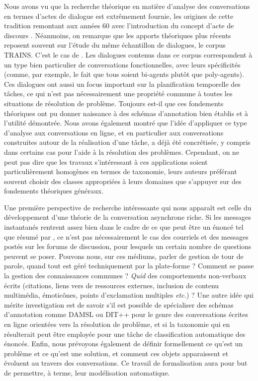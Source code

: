 \documentclass[10pt,a4paper,twoside]{article}
\begin{document}
Nous avons vu que la recherche théorique en matière d'analyse des conversations en termes d'actes de dialogue est extrêmement fournie, les origines de cette tradition remontant aux années 60 avec l'introduction du concept d'acte de discours \cite{austin1975how, searle1969speech}. Néanmoins, on remarque que les apports théoriques plus récents reposent souvent sur l'étude du même échantillon de dialogues, le corpus TRAINS. C'est le cas de \citet{traum1992conversation, poesio1998towards, core1997coding, bunt2009dit++}. Les dialogues contenus dans ce corpus correspondent à un type bien particulier de conversations fonctionnelles, avec leurs spécificités (comme, par exemple, le fait que tous soient bi-agents plutôt que poly-agents). Ces dialogues ont aussi un focus important sur la planification temporelle des tâches, ce qui n'est pas nécessairement une propriété commune à toutes les situations de résolution de problème. Toujours est-il que ces fondements théoriques ont pu donner naissance à des schémas d'annotation bien établis et à l'utilité démontrée. Nous avons également montré que l'idée d'appliquer ce type d'analyse aux conversations en ligne, et en particulier aux conversations construites autour de la réalisation d'une tâche, a déjà été concrétisée, y compris dans certains cas pour l'aide à la résolution des problèmes. Cependant, on ne peut pas dire que les travaux s'intéressant à ces applications soient particulièrement homogènes en termes de taxonomie, leurs auteurs préférant souvent choisir des classes appropriées à leurs domaines que s'appuyer sur des fondements théoriques généraux.

Une première perspective de recherche intéressante qui nous apparaît est celle du développement d'une théorie de la conversation asynchrone riche. Si les messages instantanés rentrent assez bien dans le cadre de ce que peut être un énoncé tel que résumé par \citet{popescu2005dialogue}, ce n'est pas nécessairement le cas des courriels et des messages postés sur les forums de discussion, pour lesquels un certain nombre de questions peuvent se poser. Pouvons nous, sur ces médiums, parler de gestion de tour de parole, quand tout est géré techniquement par la plate-forme ? Comment se passe la gestion des connaissances communes ? \textit{Quid} des comportements non-verbaux écrits (citations, liens vers de ressources externes, inclusion de contenu multimédia, émoticônes, points d'exclamation multiples \textit{etc.}) ? Une autre idée qui mérite investigation est de savoir s'il est possible de spécialiser des schémas d'annotation comme DAMSL ou DIT++ pour le genre des conversations écrites en ligne orientées vers la résolution de problème, et si la taxonomie qui en résulterait peut être employée pour une tâche de classification automatique des énoncés. Enfin, nous prévoyons également de définir formellement ce qu'est un problème et ce qu'est une solution, et comment ces objets apparaissent et évoluent au travers des conversations. Ce travail de formalisation aura pour but de permettre, à terme, leur modélisation automatique.




\end{document}
